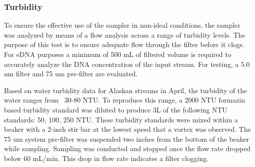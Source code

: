 \documentclass[11pt, letterpaper]{article}
\begin{document}
\subsubsection{Turbidity}
To ensure the effective use of the sampler in non-ideal conditions, the sampler was analyzed by means of a flow analysis across a range of turbidity levels. The purpose of this test is to ensure adequate flow through the filter before it clogs. For eDNA purposes a minimum of 500 mL of filtered volume is required to accurately analyze the DNA concentration of the input stream. For testing, a 5.0 um filter and 75 um pre-filter are evaluated.
\newline\par\noindent
Based on water turbidity data for Alaskan streams in April, the turbidity of the water ranges from ~30-80 NTU. To reproduce this range, a 2000 NTU formazin based turbidity standard was diluted to produce 3L of the following NTU standards: 50, 100, 250 NTU. These turbidity standards were mixed within a beaker with a 2-inch stir bar at the lowest speed that a vortex was observed. The 75 um system pre-filter was suspended two inches from the bottom of the beaker while sampling. Sampling was conducted and stopped once the flow rate dropped below 60 mL/min. This drop in flow rate indicates a filter clogging.
\end{document}
